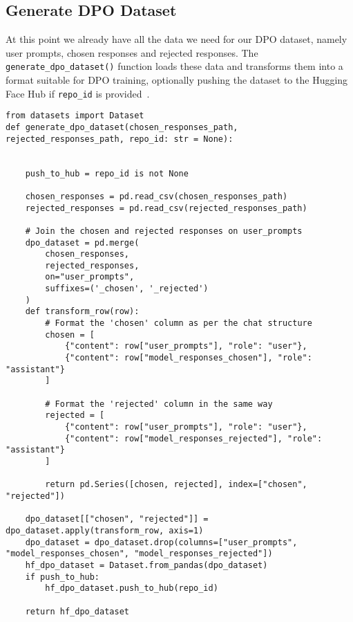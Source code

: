 \subsection{Generate DPO Dataset}

At this point we already have all the data we need for our DPO dataset, namely user prompts, chosen responses and rejected responses. The \texttt{generate\_dpo\_dataset()} function loads these data and transforms them into a format suitable for DPO training, optionally pushing the dataset to the Hugging Face Hub if \texttt{repo\_id} is provided~.

\begin{verbatim}
from datasets import Dataset
def generate_dpo_dataset(chosen_responses_path, rejected_responses_path, repo_id: str = None):


    push_to_hub = repo_id is not None

    chosen_responses = pd.read_csv(chosen_responses_path)
    rejected_responses = pd.read_csv(rejected_responses_path)

    # Join the chosen and rejected responses on user_prompts
    dpo_dataset = pd.merge(
        chosen_responses,
        rejected_responses,
        on="user_prompts",
        suffixes=('_chosen', '_rejected')
    )
    def transform_row(row):
        # Format the 'chosen' column as per the chat structure
        chosen = [
            {"content": row["user_prompts"], "role": "user"},
            {"content": row["model_responses_chosen"], "role": "assistant"}
        ]
        
        # Format the 'rejected' column in the same way
        rejected = [
            {"content": row["user_prompts"], "role": "user"},
            {"content": row["model_responses_rejected"], "role": "assistant"}
        ]
        
        return pd.Series([chosen, rejected], index=["chosen", "rejected"])

    dpo_dataset[["chosen", "rejected"]] = dpo_dataset.apply(transform_row, axis=1)
    dpo_dataset = dpo_dataset.drop(columns=["user_prompts", "model_responses_chosen", "model_responses_rejected"])
    hf_dpo_dataset = Dataset.from_pandas(dpo_dataset)
    if push_to_hub:
        hf_dpo_dataset.push_to_hub(repo_id)

    return hf_dpo_dataset
\end{verbatim}


